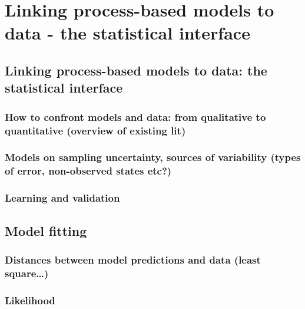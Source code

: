 \documentclass[
]{book}
\theoremstyle{definition}
\theoremstyle{definition}
\theoremstyle{definition}
\theoremstyle{definition}
\theoremstyle{remark}
\begin{document}
\chapter{Linking process-based models to data - the statistical interface}\label{linking-process-based-models-to-data---the-statistical-interface}

\section{Linking process-based models to data: the statistical interface}\label{linking-process-based-models-to-data-the-statistical-interface}

\subsection{How to confront models and data: from qualitative to quantitative (overview of existing lit)}\label{how-to-confront-models-and-data-from-qualitative-to-quantitative-overview-of-existing-lit}

\subsection{Models on sampling uncertainty, sources of variability (types of error, non-observed states etc?)}\label{models-on-sampling-uncertainty-sources-of-variability-types-of-error-non-observed-states-etc}

\subsection{Learning and validation}\label{learning-and-validation}

\section{Model fitting}\label{model-fitting}

\subsection{Distances between model predictions and data (least square\ldots)}\label{distances-between-model-predictions-and-data-least-square}

\subsection{Likelihood}\label{likelihood}
\end{document}
